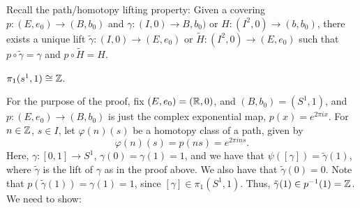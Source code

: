 \noindent Recall the path/homotopy lifting property: Given a covering $p : (E, e_0) \to (B, b_0)$ and $\gamma : (I, 0) \to B, b_0)$ or $H : (I^2, 0) \to (b, b_0)$, there exists a unique lift $\tilde{\gamma} : (I, 0) \to (E, e_0)$ or $\tilde{H} : (I^2, 0) \to (E, e_0)$ such that $p \circ \tilde{\gamma} = \gamma$ and $p \circ \tilde{H} = H$.
\begin{simplethm}
    $\pi_1(s^1, 1) \cong \mathbb Z$.
\end{simplethm}
\noindent For the purpose of the proof, fix $(E, e_0) = (\mathbb R, 0)$, and $(B, b_0) = (S^1, 1)$, and $p : (E, e_0) \to (B, b_0)$ is just the complex exponential map, $p(x) = e^{2\pi i x}$.
\medskip\newline
\noindent For $n \in \mathbb Z$, $s \in I$, let $\varphi(n)(s)$ be a homotopy class of a path, given by
\[ \varphi(n)(s) = p(ns) = e^{2 \pi i n s}. \]
Here, $\gamma : [0, 1] \to S^1$, $\gamma(0) = \gamma(1) = 1$, and we have that $\psi([\gamma]) = \tilde{\gamma}(1)$, where $\tilde{\gamma}$ is the lift of $\gamma$ as in the proof above. We also have that $\tilde{\gamma}(0) = 0$. Note that $p(\tilde{\gamma}(1)) = \gamma(1) = 1$, since $[\gamma] \in \pi_1(S^1, 1)$. Thus, $\tilde{\gamma}(1) \in p^{-1}(1) = \mathbb Z$. We need to show:

